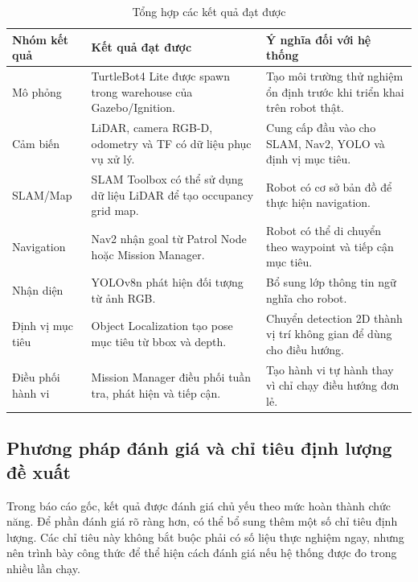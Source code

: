 \begin{table}[H]
    \centering
    \caption{Tổng hợp các kết quả đạt được}
    \label{tab:achieved-results}
    \renewcommand{\arraystretch}{1.25}
    \small
    \begin{tabularx}{\textwidth}{|>{\raggedright\arraybackslash}p{}|>{\raggedright\arraybackslash}p{}|>{\raggedright\arraybackslash}X|}
        \hline
        \textbf{Nhóm kết quả} & \textbf{Kết quả đạt được} & \textbf{Ý nghĩa đối với hệ thống} \\
        \hline
        Mô phỏng & TurtleBot4 Lite được spawn trong warehouse của Gazebo/Ignition. & Tạo môi trường thử nghiệm ổn định trước khi triển khai trên robot thật. \\
        \hline
        Cảm biến & LiDAR, camera RGB-D, odometry và TF có dữ liệu phục vụ xử lý. & Cung cấp đầu vào cho SLAM, Nav2, YOLO và định vị mục tiêu. \\
        \hline
        SLAM/Map & SLAM Toolbox có thể sử dụng dữ liệu LiDAR để tạo occupancy grid map. & Robot có cơ sở bản đồ để thực hiện navigation. \\
        \hline
        Navigation & Nav2 nhận goal từ Patrol Node hoặc Mission Manager. & Robot có thể di chuyển theo waypoint và tiếp cận mục tiêu. \\
        \hline
        Nhận diện & YOLOv8n phát hiện đối tượng từ ảnh RGB. & Bổ sung lớp thông tin ngữ nghĩa cho robot. \\
        \hline
        Định vị mục tiêu & Object Localization tạo pose mục tiêu từ bbox và depth. & Chuyển detection 2D thành vị trí không gian để dùng cho điều hướng. \\
        \hline
        Điều phối hành vi & Mission Manager điều phối tuần tra, phát hiện và tiếp cận. & Tạo hành vi tự hành thay vì chỉ chạy điều hướng đơn lẻ. \\
        \hline
    \end{tabularx}
\end{table}

\subsection{Phương pháp đánh giá và chỉ tiêu định lượng đề xuất}
\label{subsec:quantitative-metrics}

Trong báo cáo gốc, kết quả được đánh giá chủ yếu theo mức hoàn thành chức năng. Để phần đánh giá rõ ràng hơn, có thể bổ sung thêm một số chỉ tiêu định lượng. Các chỉ tiêu này không bắt buộc phải có số liệu thực nghiệm ngay, nhưng nên trình bày công thức để thể hiện cách đánh giá nếu hệ thống được đo trong nhiều lần chạy.


